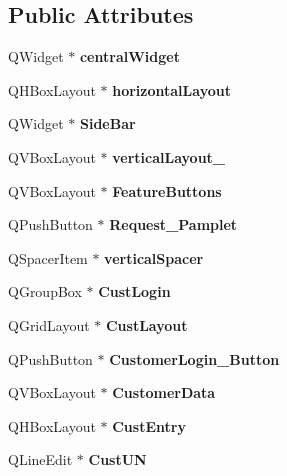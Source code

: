 \subsection*{Public Attributes}
\begin{DoxyCompactItemize}
\item 
\mbox{\label{class_ui___main_window_a30075506c2116c3ed4ff25e07ae75f81}} 
Q\+Widget $\ast$ {\bfseries central\+Widget}
\item 
\mbox{\label{class_ui___main_window_acd6fdc9ebacc4b25b834162380d75ce8}} 
Q\+H\+Box\+Layout $\ast$ {\bfseries horizontal\+Layout}
\item 
\mbox{\label{class_ui___main_window_a60844aa941f8f981d51669e469bdfff0}} 
Q\+Widget $\ast$ {\bfseries Side\+Bar}
\item 
\mbox{\label{class_ui___main_window_afcc20a3d5058037a00cdc6122f231848}} 
Q\+V\+Box\+Layout $\ast$ {\bfseries vertical\+Layout\+\_}
\item 
\mbox{\label{class_ui___main_window_a39685756da931aa377d40e45f7965e05}} 
Q\+V\+Box\+Layout $\ast$ {\bfseries Feature\+Buttons}
\item 
\mbox{\label{class_ui___main_window_a90cbee2a16bfc23cb553425671cae938}} 
Q\+Push\+Button $\ast$ {\bfseries Request\+\_\+\+Pamplet}
\item 
\mbox{\label{class_ui___main_window_a8384329c3663ff274e926a12024aab52}} 
Q\+Spacer\+Item $\ast$ {\bfseries vertical\+Spacer}
\item 
\mbox{\label{class_ui___main_window_afc7159bfdffab43a8d73004ff7d4a65b}} 
Q\+Group\+Box $\ast$ {\bfseries Cust\+Login}
\item 
\mbox{\label{class_ui___main_window_aa414c73d0080a7fe0b96a8f8ff59147d}} 
Q\+Grid\+Layout $\ast$ {\bfseries Cust\+Layout}
\item 
\mbox{\label{class_ui___main_window_a0da3646e2a404ffbbf1c9a03b95ff8e2}} 
Q\+Push\+Button $\ast$ {\bfseries Customer\+Login\+\_\+\+Button}
\item 
\mbox{\label{class_ui___main_window_a1be097f889b5a7d7f925687233662ab7}} 
Q\+V\+Box\+Layout $\ast$ {\bfseries Customer\+Data}
\item 
\mbox{\label{class_ui___main_window_a64ca2d292de00587b718b740993d0e40}} 
Q\+H\+Box\+Layout $\ast$ {\bfseries Cust\+Entry}
\item 
\mbox{\label{class_ui___main_window_abbdc001e5f5b8d9db3508aecc48a5a9c}} 
Q\+Line\+Edit $\ast$ {\bfseries Cust\+UN}
\item 
\mbox{\label{class_ui___main_window_ae33f13aa508a5ec3e5566a83c63c3221}} 

\end{DoxyCompactItemize}
